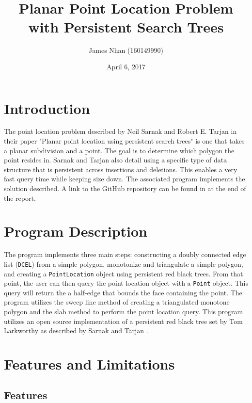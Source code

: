 \documentclass[11pt]{article}
\title{Planar Point Location Problem with Persistent Search Trees}
\date{April 6, 2017}
\author{James Nhan (160149990)}
\begin{document}
\maketitle

\section{Introduction}
\label{sec:intro}

	The point location problem described by Neil Sarnak and Robert E. Tarjan in their paper "Planar point location using persistent search trees" \cite{sarnaktarjan} is one that takes a planar subdivision and a point. The goal is to determine which polygon the point resides in. Sarnak and Tarjan also detail using a specific type of data structure that is persistent across insertions and deletions. This enables a very fast query time while keeping size down. The associated program implements the solution described. A link to the GitHub repository can be found in at the end of the report.
	
\section{Program Description}
\label{sec:description}

	The program implements three main steps: constructing a doubly connected edge list (\texttt{DCEL}) from a simple polygon, monotonize and triangulate a simple polygon, and creating a \texttt{PointLocation} object using persistent red black trees. From that point, the user can then query the point location object with a \texttt{Point} object. This query will return the a half-edge that bounds the face containing the point. The program utilizes the sweep line method of creating a triangulated monotone polygon and the slab method to perform the point location query. This program utilizes an open source implementation of a persistent red black tree set by Tom Larkworthy \cite{tomlarkworthy} as described by Sarnak and Tarjan \cite{sarnaktarjan}.
	
\section{Features and Limitations}
\label{sec:featlims}

\subsection{Features}
\label{sec:features}
\end{document}
